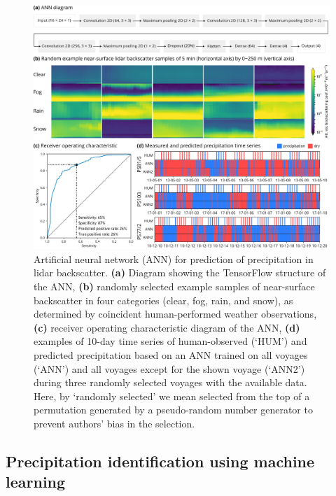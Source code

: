 \documentclass[12pt,a4paper]{article}
\begin{document}
\begin{figure}[b!]
\centering
\includegraphics[width=\textwidth]{img/ann.pdf}
\caption{
Artificial neural network (ANN) for prediction of precipitation in lidar
backscatter. \textbf{(a)} Diagram showing the TensorFlow structure of the ANN,
\textbf{(b)} randomly selected example samples of near-surface backscatter in
four categories (clear, fog, rain, and snow), as determined by coincident
human-performed weather observations, \textbf{(c)} receiver operating
characteristic diagram of the ANN, \textbf{(d)} examples of 10-day time series
of human-observed (`HUM') and predicted precipitation based on an ANN trained
on all voyages (`ANN') and all voyages except for the shown voyage (`ANN2')
during three randomly selected voyages with the available data. Here, by
`randomly selected' we mean selected from the top of a permutation generated by
a pseudo-random number generator to prevent authors' bias in the selection.
}
\label{fig:ann}
\end{figure}

\subsection{Precipitation identification using machine learning}
\label{sec:ann}
\end{document}
